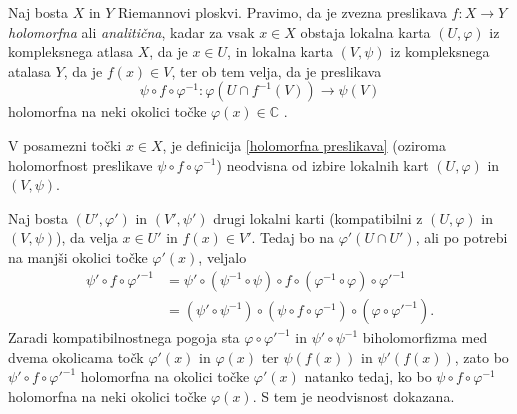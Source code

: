 \documentclass[mat1]{fmfdelo}
\numberwithin{equation}{section}
\newcommand{\C}{\mathbb C}
\newcommand{\inv}{^{-1}}
\theoremstyle{definition}
\begin{document}


\begin{definicija}
    \label{holomorfna preslikava}
    Naj bosta $X$ in $Y$ Riemannovi ploskvi. Pravimo, da je zvezna preslikava $f:X \to Y$ \emph{holomorfna} ali \emph{analitična}, kadar za vsak $x \in X$ obstaja lokalna karta $(U, \varphi)$ iz kompleksnega atlasa $X$, da je $x \in U$, in lokalna karta $(V, \psi)$ iz kompleksnega atalasa $Y$, da je $f(x) \in V$, ter ob tem velja, da je preslikava  
    \[
        \psi \circ f \circ \varphi\inv : \varphi(U \cap f\inv(V)) \to \psi(V)
    \]
    holomorfna na neki okolici točke $\varphi(x) \in \C$ .
\end{definicija}

\begin{trditev}
    V posamezni točki $x \in X$, je definicija \ref{holomorfna preslikava} (oziroma holomorfnost preslikave $\psi \circ f \circ \varphi\inv$) neodvisna od izbire lokalnih kart $(U, \varphi)$ in $(V, \psi)$. 
\end{trditev}

\begin{dokaz}
    Naj bosta $(U', \varphi')$ in $(V', \psi')$ drugi lokalni karti (kompatibilni z $(U, \varphi)$ in $(V, \psi)$), da velja $x \in U'$ in $f(x) \in V'$. Tedaj bo na $\varphi'(U \cap U')$, ali po potrebi na manjši okolici točke $\varphi'(x)$, veljalo
    \begin{align*}    
        \psi' \circ f \circ {\varphi'}\inv &= 
        \psi' \circ (\psi\inv \circ \psi) \circ f \circ (\varphi\inv \circ \varphi) \circ {\varphi'}\inv \\
        &= (\psi' \circ \psi\inv) \circ (\psi \circ f \circ \varphi\inv) \circ (\varphi \circ {\varphi'}\inv).
    \end{align*}
    Zaradi kompatibilnostnega pogoja sta $\varphi \circ {\varphi'}\inv$ in $\psi' \circ \psi\inv$ biholomorfizma med dvema okolicama točk $\varphi'(x)$ in $\varphi(x)$ ter $\psi(f(x))$ in $\psi'(f(x))$, zato bo $\psi' \circ f \circ {\varphi'}\inv$ holomorfna na okolici točke $\varphi'(x)$ natanko tedaj, ko bo $\psi \circ f \circ \varphi\inv$ holomorfna na neki okolici točke $\varphi(x)$. S tem je neodvisnost dokazana. 
\end{dokaz}
\end{document}
